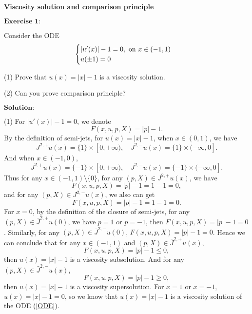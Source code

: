 \documentclass[12pt,a4paper]{ctexart}
\begin{document}
\begin{center}
\textbf{Viscosity solution and comparison principle}
\end{center}

\vspace{12pt}

$\textbf{Exercise 1:}$

Consider the ODE
\begin{equation} \label{ODE}
    \begin{cases}
   |u'(x)| -1 = 0, \hbox{ on } x \in (-1, 1) \\
   u(\pm 1) = 0
   \end{cases}
\end{equation}


(1) Prove that $u(x) = |x|-1$ is a viscosity solution.

(2) Can you prove comparison principle?

\vspace{8pt}

$\textbf{Solution:}$

(1) For $|u'(x)| - 1 = 0$, we denote 
\begin{equation} 
    F(x, u, p, X) = |p| - 1.
\end{equation}
By the definition of semi-jets, for $u(x) = |x| - 1$, when $x \in (0,1)$, we have
\begin{equation*}
    J^{2,+} u(x) = \{1\} \times [0, + \infty), \quad J^{2, -} u(x) = \{1 \} \times (- \infty, 0].
\end{equation*}
And when $x \in (-1, 0)$, 
\begin{equation*}
    J^{2,+} u(x) = \{-1\} \times [0, + \infty), \quad J^{2, -} u(x) = \{-1 \} \times (- \infty, 0].
\end{equation*}
Thus for any $x \in (-1, 1) \setminus \{0\}$, for any $(p, X) \in J^{2,+} u(x)$, we have
\begin{equation*}
    F(x, u, p, X) = |p| - 1 = 1 - 1 = 0,
\end{equation*}
and for any $(p, X) \in J^{2,-} u(x)$, we also can get
\begin{equation*}
    F(x, u, p, X) = |p| - 1 = 1 - 1 = 0.
\end{equation*}
For $x = 0$, by the definition of the closure of semi-jets, for any $(p, X) \in \bar{J}^{2,+} u(0)$, we have $p = 1$ or $p = -1$, then $F(x, u, p, X) = |p| - 1 = 0$. Similarly, for any $(p, X) \in \bar{J}^{2,-} u(0)$, $F(x, u, p, X) = |p| - 1 = 0$. Hence we can conclude that for any $x \in (-1, 1)$ and $(p, X) \in \bar{J}^{2,+} u(x)$,
\begin{equation*}
    F(x, u, p, X) = |p| - 1 \leq 0,
\end{equation*}
then $u(x) = |x| - 1$ is a viscosity subsolution. And for any $(p, X) \in \bar{J}^{2,-} u(x)$,
\begin{equation*}
    F(x, u, p, X) = |p| - 1 \geq 0,
\end{equation*}
then $u(x) = |x| - 1$ is a viscosity supersolution. For $x = 1$ or $x = -1$, $u(x) = |x| - 1 = 0$, so we know that $u(x) = |x| - 1$ is a viscosity solution of the ODE (\ref{ODE}).
\end{document}
